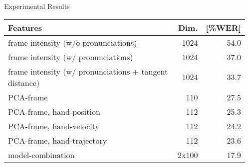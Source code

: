 \documentclass[final,t]{beamer}
\begin{document}
\begin{frame}{}
\begin{columns}[t]
\begin{column}{.3\linewidth}
    \end{column}

    
    \begin{column}{.3\linewidth}

      \begin{block}{Experimental Results}
        \centering

        \begin{table}
          \centering
          \begin{tabular}{@{} p{.7\linewidth} r r @{}}
            \toprule
            Features                                                             & Dim.            & [\%WER] \\
            \midrule
            frame intensity (w/o pronunciations)                                 & 1024            & 54.0    \\%
            frame intensity (w/ pronunciations)                                  & 1024            & 37.0    \\
            frame intensity (w/ pronunciations + tangent distance)               & 1024            & 33.7    \\%
            PCA-frame                                                            & 110             & 27.5    \\
            PCA-frame, hand-position                                             & 112             & 25.3    \\
            PCA-frame, hand-velocity                                             & 112             & 24.2    \\
            PCA-frame, hand-trajectory                                           & 112             & 23.6    \\
            \addlinespace
            \addlinespace
            model-combination                                                    & 2x100           & 17.9    \\
            \bottomrule
          \end{tabular}
          \label{tab:baseline-results}
        \end{table}
      \end{block}
      

\end{column}
\end{columns}
\end{frame}
\end{document}
